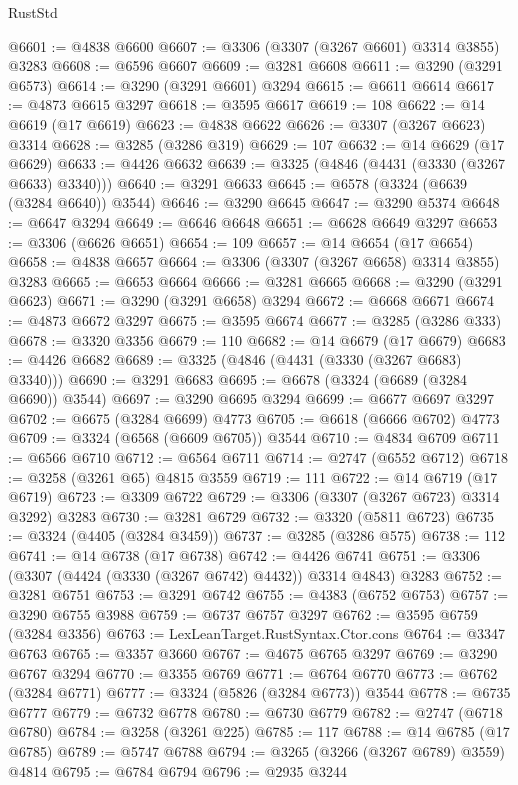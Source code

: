 \begin{lexlean}{RustStd}
\begin{coremodule}
@6601 := @4838 @6600
@6607 := @3306 (@3307 (@3267 @6601) @3314 @3855) @3283
@6608 := @6596 @6607
@6609 := @3281 @6608
@6611 := @3290 (@3291 @6573)
@6614 := @3290 (@3291 @6601) @3294
@6615 := @6611 @6614
@6617 := @4873 @6615 @3297
@6618 := @3595 @6617
@6619 := 108
@6622 := @14 @6619 (@17 @6619)
@6623 := @4838 @6622
@6626 := @3307 (@3267 @6623) @3314
@6628 := @3285 (@3286 @319)
@6629 := 107
@6632 := @14 @6629 (@17 @6629)
@6633 := @4426 @6632
@6639 := @3325 (@4846 (@4431 (@3330 (@3267 @6633) @3340)))
@6640 := @3291 @6633
@6645 := @6578 (@3324 (@6639 (@3284 @6640)) @3544)
@6646 := @3290 @6645
@6647 := @3290 @5374
@6648 := @6647 @3294
@6649 := @6646 @6648
@6651 := @6628 @6649 @3297
@6653 := @3306 (@6626 @6651)
@6654 := 109
@6657 := @14 @6654 (@17 @6654)
@6658 := @4838 @6657
@6664 := @3306 (@3307 (@3267 @6658) @3314 @3855) @3283
@6665 := @6653 @6664
@6666 := @3281 @6665
@6668 := @3290 (@3291 @6623)
@6671 := @3290 (@3291 @6658) @3294
@6672 := @6668 @6671
@6674 := @4873 @6672 @3297
@6675 := @3595 @6674
@6677 := @3285 (@3286 @333)
@6678 := @3320 @3356
@6679 := 110
@6682 := @14 @6679 (@17 @6679)
@6683 := @4426 @6682
@6689 := @3325 (@4846 (@4431 (@3330 (@3267 @6683) @3340)))
@6690 := @3291 @6683
@6695 := @6678 (@3324 (@6689 (@3284 @6690)) @3544)
@6697 := @3290 @6695 @3294
@6699 := @6677 @6697 @3297
@6702 := @6675 (@3284 @6699) @4773
@6705 := @6618 (@6666 @6702) @4773
@6709 := @3324 (@6568 (@6609 @6705)) @3544
@6710 := @4834 @6709
@6711 := @6566 @6710
@6712 := @6564 @6711
@6714 := @2747 (@6552 @6712)
@6718 := @3258 (@3261 @65) @4815 @3559
@6719 := 111
@6722 := @14 @6719 (@17 @6719)
@6723 := @3309 @6722
@6729 := @3306 (@3307 (@3267 @6723) @3314 @3292) @3283
@6730 := @3281 @6729
@6732 := @3320 (@5811 @6723)
@6735 := @3324 (@4405 (@3284 @3459))
@6737 := @3285 (@3286 @575)
@6738 := 112
@6741 := @14 @6738 (@17 @6738)
@6742 := @4426 @6741
@6751 := @3306 (@3307 (@4424 (@3330 (@3267 @6742) @4432)) @3314 @4843) @3283
@6752 := @3281 @6751
@6753 := @3291 @6742
@6755 := @4383 (@6752 @6753)
@6757 := @3290 @6755 @3988
@6759 := @6737 @6757 @3297
@6762 := @3595 @6759 (@3284 @3356)
@6763 := LexLeanTarget.RustSyntax.Ctor.cons
@6764 := @3347 @6763
@6765 := @3357 @3660
@6767 := @4675 @6765 @3297
@6769 := @3290 @6767 @3294
@6770 := @3355 @6769
@6771 := @6764 @6770
@6773 := @6762 (@3284 @6771)
@6777 := @3324 (@5826 (@3284 @6773)) @3544
@6778 := @6735 @6777
@6779 := @6732 @6778
@6780 := @6730 @6779
@6782 := @2747 (@6718 @6780)
@6784 := @3258 (@3261 @225)
@6785 := 117
@6788 := @14 @6785 (@17 @6785)
@6789 := @5747 @6788
@6794 := @3265 (@3266 (@3267 @6789) @3559) @4814
@6795 := @6784 @6794
@6796 := @2935 @3244

\end{coremodule}
\end{lexlean}

